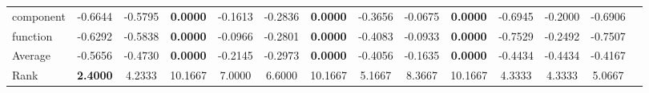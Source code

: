 \begin{threeparttable}
\begin{tabular}{lccccccccccccc}
component &-0.6644 &-0.5795 &\textbf{0.0000} &-0.1613 &-0.2836 &\textbf{0.0000} &-0.3656 &-0.0675 &\textbf{0.0000} &-0.6945 &-0.2000 &-0.6906 &  \\
function &-0.6292 &-0.5838 &\textbf{0.0000} &-0.0966 &-0.2801 &\textbf{0.0000} &-0.4083 &-0.0933 &\textbf{0.0000} &-0.7529 &-0.2492 &-0.7507 &  \\
\hline
Average &-0.5656 &-0.4730 &\textbf{0.0000} &-0.2145 &-0.2973 &\textbf{0.0000} &-0.4056 &-0.1635 &\textbf{0.0000} &-0.4434 &-0.4434 &-0.4167 &  \\
Rank &\textbf{2.4000} &4.2333 &10.1667 &7.0000 &6.6000 &10.1667 &5.1667 &8.3667 &10.1667 &4.3333 &4.3333 &5.0667 &  \\
\bottomrule
\end{tabular}
\end{threeparttable}